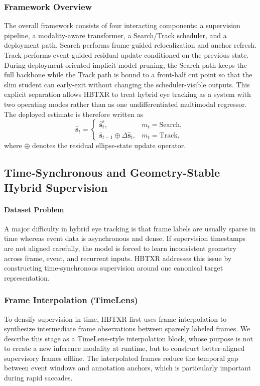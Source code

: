 \documentclass[journal]{IEEEtran}
\begin{document}
\subsubsection{Framework Overview}
The overall framework consists of four interacting components: a supervision pipeline, a modality-aware transformer, a Search/Track scheduler, and a deployment path. Search performs frame-guided relocalization and anchor refresh. Track performs event-guided residual update conditioned on the previous state. During deployment-oriented implicit model pruning, the Search path keeps the full backbone while the Track path is bound to a front-half cut point so that the slim student can early-exit without changing the scheduler-visible outputs. This explicit separation allows HBTXR to treat hybrid eye tracking as a system with two operating modes rather than as one undifferentiated multimodal regressor. The deployed estimate is therefore written as
\begin{equation}
\hat{\mathbf{s}}_t=
\begin{cases}
\hat{\mathbf{s}}_t^{\mathrm{s}}, & m_t=\mathrm{Search},\\
\bar{\mathbf{s}}_{t-1}\oplus\Delta\hat{\mathbf{s}}_t, & m_t=\mathrm{Track},
\end{cases}
\end{equation}
where $\oplus$ denotes the residual ellipse-state update operator.

\subsection{Time-Synchronous and Geometry-Stable Hybrid Supervision}
\paragraph*{Dataset Problem}
A major difficulty in hybrid eye tracking is that frame labels are usually sparse in time whereas event data is asynchronous and dense. If supervision timestamps are not aligned carefully, the model is forced to learn inconsistent geometry across frame, event, and recurrent inputs. HBTXR addresses this issue by constructing time-synchronous supervision around one canonical target representation.

\subsubsection{Frame Interpolation (TimeLens)}
To densify supervision in time, HBTXR first uses frame interpolation to synthesize intermediate frame observations between sparsely labeled frames. We describe this stage as a TimeLens-style interpolation block, whose purpose is not to create a new inference modality at runtime, but to construct better-aligned supervisory frames offline. The interpolated frames reduce the temporal gap between event windows and annotation anchors, which is particularly important during rapid saccades.
\end{document}
